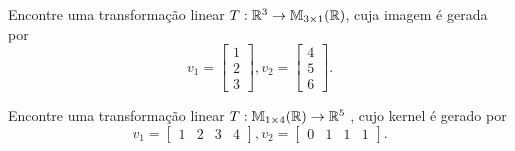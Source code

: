 \documentclass[12pt]{exam}
\begin{document}
\begin{exercicio}
    Encontre uma transformação linear $T : \mathbb{R}^3 \to \mathbb{M}_{3 \times 1}(\mathbb{R})$, cuja imagem é gerada por
    \[
        v_1 = \begin{bmatrix}
                1\\2\\3
              \end{bmatrix},
        v_2 = \begin{bmatrix}
                 4\\5\\6
              \end{bmatrix}.
    \]
\end{exercicio}

\begin{exercicio}
    Encontre uma transformação linear $T : \mathbb{M}_{1 \times 4}(\mathbb{R}) \to \mathbb{R}^5$ , cujo kernel é gerado por
    \[
        v_1 = \begin{bmatrix}
                1 & 2 & 3 & 4
              \end{bmatrix},
        v_2 = \begin{bmatrix}
                0 & 1 & 1 & 1
              \end{bmatrix}.
    \]
\end{exercicio}
\end{document}
